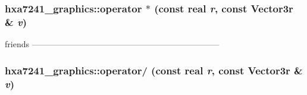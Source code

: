 \subsubsection{ hxa7241\_\-graphics::operator $\ast$ (const real {\em r}, const {\bf Vector3r} \& {\em v})}\label{namespacehxa7241__graphics_93fa5571b153e88e195ed93966ad0605}


friends -------------------------------------------------------------------- 

\subsubsection{ hxa7241\_\-graphics::operator/ (const real {\em r}, const {\bf Vector3r} \& {\em v})}\label{namespacehxa7241__graphics_5dd42f9a5a298691181c114b09155a98}


